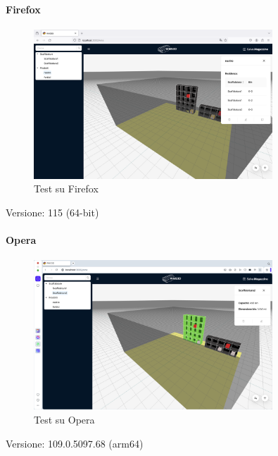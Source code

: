 \paragraph{Firefox}
\begin{figure}[h!] 
    \centering
    \includegraphics[width=0.8\textwidth]{images/firefox.png}
    \caption{Test su Firefox}
\end{figure}
Versione: 115 (64-bit)

\paragraph{Opera}
\begin{figure}[h!] 
    \centering
    \includegraphics[width=0.8\textwidth]{images/opera.png}
    \caption{Test su Opera}
\end{figure}
Versione: 109.0.5097.68 (arm64)

\newpage

